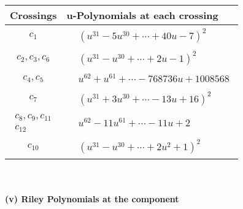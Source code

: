 \documentclass[1p]{elsarticle_modified}
\theoremstyle{definition}
\begin{document}
\begin{tabular}{m{50pt}|m{274pt}}
Crossings & \hspace{64pt}u-Polynomials at each crossing \\
\hline $$\begin{aligned}c_{1}\end{aligned}$$&$\begin{aligned}
&(u^{31}-5 u^{30}+\cdots+40 u-7)^{2}
\end{aligned}$\\
\hline $$\begin{aligned}c_{2},c_{3},c_{6}\end{aligned}$$&$\begin{aligned}
&(u^{31}- u^{30}+\cdots+2 u-1)^{2}
\end{aligned}$\\
\hline $$\begin{aligned}c_{4},c_{5}\end{aligned}$$&$\begin{aligned}
&u^{62}+u^{61}+\cdots-768736 u+1008568
\end{aligned}$\\
\hline $$\begin{aligned}c_{7}\end{aligned}$$&$\begin{aligned}
&(u^{31}+3 u^{30}+\cdots-13 u+16)^{2}
\end{aligned}$\\
\hline $$\begin{aligned}c_{8},c_{9},c_{11}\\c_{12}\end{aligned}$$&$\begin{aligned}
&u^{62}-11 u^{61}+\cdots-11 u+2
\end{aligned}$\\
\hline $$\begin{aligned}c_{10}\end{aligned}$$&$\begin{aligned}
&(u^{31}- u^{30}+\cdots+2 u^2+1)^{2}
\end{aligned}$\\
\hline
\end{tabular}\\~\\
\newpage\renewcommand{\arraystretch}{1}
\flushleft \textbf{(v) Riley Polynomials at the component}\newline \\
\end{document}
